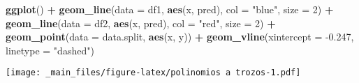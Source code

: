 \documentclass[
]{book}
\newenvironment{Shaded}{\begin{snugshade}}{\end{snugshade}}
\newcommand{\DataTypeTok}[1]{\textcolor[rgb]{0.13,0.29,0.53}{#1}}
\newcommand{\DecValTok}[1]{\textcolor[rgb]{0.00,0.00,0.81}{#1}}
\newcommand{\FloatTok}[1]{\textcolor[rgb]{0.00,0.00,0.81}{#1}}
\newcommand{\KeywordTok}[1]{\textcolor[rgb]{0.13,0.29,0.53}{\textbf{#1}}}
\newcommand{\NormalTok}[1]{#1}
\newcommand{\OperatorTok}[1]{\textcolor[rgb]{0.81,0.36,0.00}{\textbf{#1}}}
\newcommand{\StringTok}[1]{\textcolor[rgb]{0.31,0.60,0.02}{#1}}
\begin{document}
\begin{Shaded}
\begin{Highlighting}[]
\KeywordTok{ggplot}\NormalTok{() }\OperatorTok{+}\StringTok{ }
\StringTok{  }\KeywordTok{geom_line}\NormalTok{(}\DataTypeTok{data =}\NormalTok{ df1, }\KeywordTok{aes}\NormalTok{(x, pred), }\DataTypeTok{col =} \StringTok{"blue"}\NormalTok{, }\DataTypeTok{size =} \DecValTok{2}\NormalTok{) }\OperatorTok{+}
\StringTok{  }\KeywordTok{geom_line}\NormalTok{(}\DataTypeTok{data =}\NormalTok{ df2, }\KeywordTok{aes}\NormalTok{(x, pred), }\DataTypeTok{col =} \StringTok{"red"}\NormalTok{, }\DataTypeTok{size =} \DecValTok{2}\NormalTok{) }\OperatorTok{+}
\StringTok{  }\KeywordTok{geom_point}\NormalTok{(}\DataTypeTok{data =}\NormalTok{ data.split, }\KeywordTok{aes}\NormalTok{(x, y)) }\OperatorTok{+}
\StringTok{  }\KeywordTok{geom_vline}\NormalTok{(}\DataTypeTok{xintercept =} \FloatTok{-0.247}\NormalTok{, }\DataTypeTok{linetype =} \StringTok{"dashed"}\NormalTok{)}
\end{Highlighting}
\end{Shaded}

\texttt{[image: \_main\_files/figure-latex/polinomios a trozos-1.pdf]}
\end{document}
